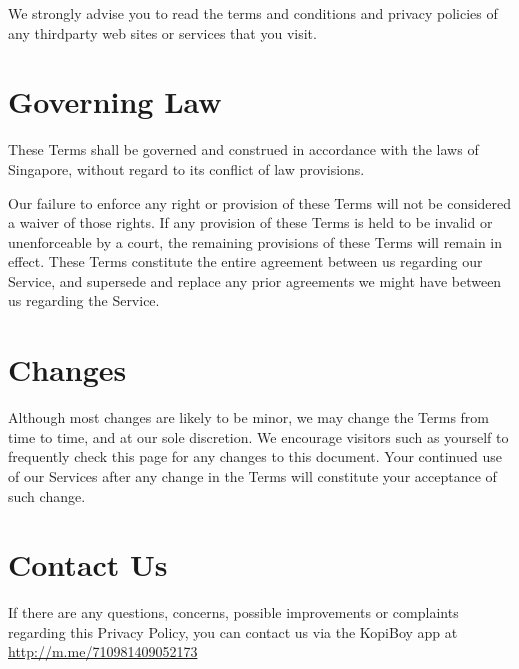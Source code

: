 \documentclass[11pt]{article}
\begin{document}
We strongly advise you to read the terms and conditions and privacy policies of any third­party
web sites or services that you visit.

\section{Governing Law}

These Terms shall be governed and construed in accordance with the laws of Singapore, without 
regard to its conflict of law provisions.

Our failure to enforce any right or provision of these Terms will not be considered a waiver of
those rights. If any provision of these Terms is held to be invalid or unenforceable by a court, the
remaining provisions of these Terms will remain in effect. These Terms constitute the entire
agreement between us regarding our Service, and supersede and replace any prior agreements
we might have between us regarding the Service.

\section{Changes}

Although most changes are likely to be minor, we may change the Terms from
time to time, and at our sole discretion. We encourage visitors such as yourself to
frequently check this page for any changes to this document. Your continued use of
our Services after any change in the Terms will constitute your acceptance of
such change.

\section{Contact Us}

If there are any questions, concerns, possible improvements or complaints regarding
this Privacy Policy, you can contact us via the KopiBoy app at \url{http://m.me/710981409052173}
\end{document}
